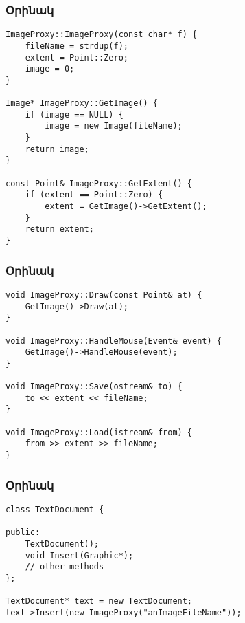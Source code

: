\documentclass{beamer}
\begin{document}
\begin{frame}[fragile]\frametitle{Օրինակ}
\begin{english}
\begin{verbatim}
ImageProxy::ImageProxy(const char* f) {
    fileName = strdup(f);
    extent = Point::Zero;
    image = 0;
}

Image* ImageProxy::GetImage() {
    if (image == NULL) {
        image = new Image(fileName);
    }
    return image;
}

const Point& ImageProxy::GetExtent() {
    if (extent == Point::Zero) {
        extent = GetImage()->GetExtent();
    }
    return extent;
}
\end{verbatim}
\end{english}
\end{frame}

\begin{frame}[fragile]\frametitle{Օրինակ}
\begin{english}
\begin{verbatim}
void ImageProxy::Draw(const Point& at) {
    GetImage()->Draw(at);
}

void ImageProxy::HandleMouse(Event& event) {
    GetImage()->HandleMouse(event);
}

void ImageProxy::Save(ostream& to) {
    to << extent << fileName;
}

void ImageProxy::Load(istream& from) {
    from >> extent >> fileName;
}
\end{verbatim}
\end{english}
\end{frame}

\begin{frame}[fragile]\frametitle{Օրինակ}
\begin{english}
\begin{verbatim}
class TextDocument {

public:
    TextDocument();
    void Insert(Graphic*);
    // other methods
};

TextDocument* text = new TextDocument;
text->Insert(new ImageProxy("anImageFileName"));
\end{verbatim}
\end{english}
\end{frame}
\end{document}
